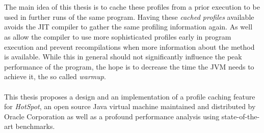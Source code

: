 \\\\
The main idea of this thesis is to cache these profiles from a prior execution to be used in further runs of the same program. 
Having these \textit{cached profiles} available avoids the JIT compiler to gather the same profiling information again. As well as allow the compiler to use more sophisticated profiles early in program execution and prevent recompilations when more information about the method is available. While this in general should not significantly influence the peak performance of the program, the hope is to decrease the time the JVM needs to achieve it, the so called \textit{warmup}.
\\\\
This thesis proposes a design and an implementation of a profile caching feature for \textit{HotSpot}, an open source Java virtual machine maintained and distributed by Oracle Corporation as well as a profound performance analysis using state-of-the-art benchmarks.
